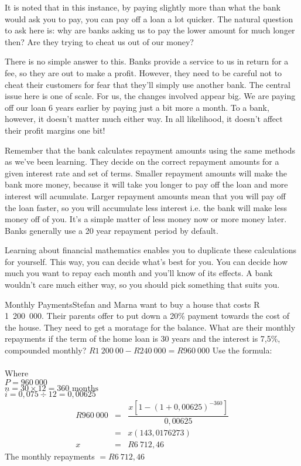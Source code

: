 It is noted that in this instance, by paying slightly more than what the bank would ask you to pay, you can pay off a loan a lot quicker. The natural question to ask here is: why are banks asking us to pay the lower amount for much longer then? Are they trying to cheat us out of our money?

There is no simple answer to this. Banks provide a service to us in return for a fee, so they are out to make a profit. However, they need to be careful not to cheat their customers for fear that they'll simply use another bank. The central issue here is one of scale. For us, the changes involved appear big. We are paying off our loan 6 years earlier by paying just a bit more a month. To a bank, however, it doesn't matter much either way. In all likelihood, it doesn't affect their profit margins one bit!

Remember that the bank calculates repayment amounts using the same methods as we've been learning. They decide on the correct repayment amounts for a given interest rate and set of terms. Smaller repayment amounts will make the bank more money, because it will take you longer to pay off the loan and more interest will acumulate. Larger repayment amounts mean that you will pay off the loan faster, so you will accumulate less interest i.e. the bank will make less money off of you. It's a simple matter of less money now or more money later. Banks generally use a 20 year repayment period by default.

Learning about financial mathematics enables you to duplicate these calculations for yourself. This way, you can decide what's best for you. You can decide how much you want to repay each month and you'll know of its effects. A bank wouldn't care much either way, so you should pick something that suits you.

\begin{wex}{Monthly Payments}{Stefan and Marna want to buy a house that costs R 1~200~000. Their parents offer to put down a 20\% payment towards the cost of the house.  They need to get a moratage for the balance.  What are their monthly repayments if the term of the home loan is 30 years and the interest is 7,5\%, compounded monthly?}
{
$R 1~200~00 - R 240~000 = R 960~000$
Use the formula: \\
\\
Where \\
$P = 960~000$\\
$n = 30 \times 12 = 360 \mbox{ months}$\\
$i = 0,075 \div 12 = 0,00625$
\begin{eqnarray*}
R 960~000&=& \dfrac{x[1-(1 + 0,00625)^{-360}]}{0,00625}\\
&=&x(143,0176273)\\
x&=&R 6~712,46
\end{eqnarray*}
The monthly repayments $= R6~712,46$
}
\end{wex}

